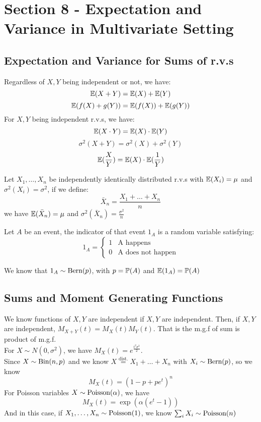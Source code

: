 \section{Section 8 - Expectation and Variance in Multivariate Setting}
\subsection{}
\subsection{Expectation and Variance for Sums of r.v.s}
\begin{theorem}
    Regardless of $X, Y$ being independent or not, we have:
    $$\mathbb{E}(X+Y) = \mathbb{E}(X) + \mathbb{E}(Y)$$
    $$\mathbb{E}(f(X) + g(Y)) = \mathbb{E}(f(X)) + \mathbb{E}(g(Y))$$
    For $X, Y$ being independent r.v.s, we have:
    $$\mathbb{E}(X \cdot Y) = \mathbb{E}(X) \cdot \mathbb{E}(Y)$$
    $$\sigma^2(X + Y) = \sigma^2(X) + \sigma^2(Y)$$
    $$\mathbb{E}(\frac{X}{Y}) = \mathbb{E}(X) \cdot \mathbb{E}(\frac{1}{Y})$$
\end{theorem}
\begin{theorem}
    Let $X_1, \dots, X_n$ be independently identically distributed r.v.s with $\mathbb{E}(X_i) = \mu$ and $\sigma^2(X_i) = \sigma^2$, if we define:
    $$\bar{X}_n = \frac{X_1 + \dots + X_n}{n}$$
    we have $\mathbb{E}(\bar{X}_n) = \mu$ and $\sigma^2(\bar{X}_n) = \frac{\sigma^2}{n}$
\end{theorem}
\begin{definition}
    Let $A$ be an event, the indicator of that event $1_A$ is a random variable satisfying:
    $$1_A = \begin{cases}
        1 & \text{A happens} \\
        0 & \text{A does not happen}
    \end{cases}$$
\end{definition}
We know that $1_A \sim \text{Bern}(p)$, with $p = \mathbb{P}(A)$ and $\mathbb{E}(1_A) = \mathbb{P}(A)$

\subsection{Sums and Moment Generating Functions}
We know functions of $X, Y$ are independent if $X, Y$ are independent. Then, if $X, Y$ are independent, $M_{X+Y}(t) = M_X(t)M_Y(t)$. That is the m.g.f of sum is product of m.g.f. \\
For $X \sim N(0, \sigma^2)$, we have $M_X(t) = e^{\frac{t^2\sigma^2}{2}}$. \\
Since $X \sim \text{Bin}(n, p)$ and we know $X \stackrel{\text{dist.}}{=} X_1 + \dots + X_n$ with $X_i \sim \text{Bern}(p)$, so we know
$$M_X(t) = (1 - p + pe^t)^n$$
For Poisson variables $X \sim \text{Poisson}(\alpha)$, we have
$$M_X(t) = \exp(\alpha(e^t - 1))$$
And in this case, if $X_1, \dots, X_n \sim \text{Poisson}(1)$, we know $\sum_{i} X_i \sim \text{Poisson}(n)$

